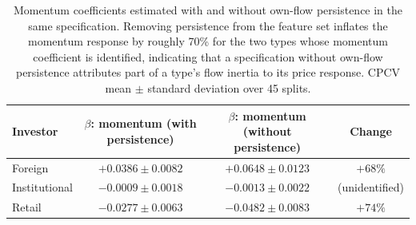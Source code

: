 \begin{table}[t]
  \caption{Momentum coefficients estimated with and without own-flow
  persistence in the same specification. Removing persistence from the
  feature set inflates the momentum response by roughly 70\% for the two
  types whose momentum coefficient is identified, indicating that a
  specification without own-flow persistence attributes part of a type's
  flow inertia to its price response. CPCV mean $\pm$ standard deviation
  over 45 splits.}
  \label{tab:momentum-conditioning}
  \centering
  \scriptsize
  \setlength{\tabcolsep}{3pt}
  \begin{tabular}{@{}lccc@{}}
    \toprule
    Investor & \shortstack{$\beta$: momentum\\(with persistence)} & \shortstack{$\beta$: momentum\\(without persistence)} & Change \\
    \midrule
    Foreign       & $+0.0386 \pm 0.0082$ & $+0.0648 \pm 0.0123$ & $+68\%$ \\
    Institutional & $-0.0009 \pm 0.0018$ & $-0.0013 \pm 0.0022$ & (unidentified) \\
    Retail        & $-0.0277 \pm 0.0063$ & $-0.0482 \pm 0.0083$ & $+74\%$ \\
    \bottomrule
  \end{tabular}
\end{table}
